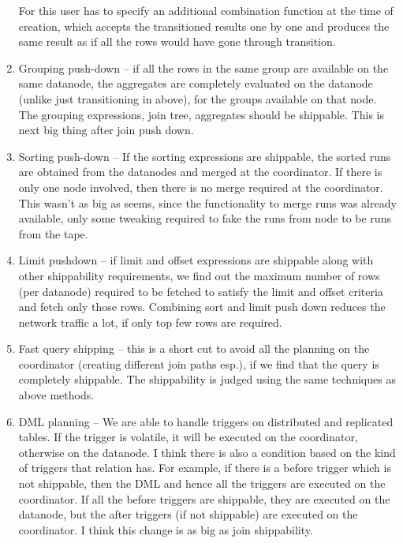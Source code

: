 \begin{enumerate}
			  For this user has to specify an additional combination function at the time of
			  creation, which accepts the transitioned results one by one and produces the
			  same result as if all the rows would have gone through transition.
		\item Grouping push-down -- if all the rows in the same group are available on the
			  same datanode, the aggregates are completely evaluated on the datanode
			  (unlike just transitioning in above), for the groups available on that node.
			  The grouping expressions, join tree, aggregates should be shippable.
			  This is next big thing after join push down.
		\item Sorting push-down -- If the sorting expressions are shippable, the sorted
			  runs are obtained from the datanodes and merged at the coordinator.
			  If there is only one node involved, then there is no merge required at
			  the coordinator.
			  This wasn't as big as seems, since the functionality to merge runs was
			  already available, only some tweaking required to fake the runs from node
			  to be runs from the tape.
		\item Limit pushdown -- if limit and offset expressions are shippable along
			  with other shippability requirements, we find out the maximum number
			  of rows (per datanode) required to be fetched to satisfy the limit
			  and offset criteria and fetch only those rows.
			  Combining sort and limit push down reduces the network traffic a lot,
			  if only top few rows are required.
		\item Fast query shipping -- this is a short cut to avoid all the planning
			  on the coordinator (creating different join paths esp.), if we find
			  that the query is completely shippable.
			  The shippability is judged using the same techniques as above methods.
		\item DML planning -- We are able to handle triggers on distributed and
			  replicated tables.
			  If the trigger is volatile, it will be executed on the coordinator, otherwise
			  on the datanode.
			  I think there is also a condition based on the kind of triggers that
			  relation has.
			  For example, if there is a before trigger which is not shippable, then the DML
			  and hence all the triggers are executed on the coordinator.
			  If all the before triggers are shippable, they are executed on the datanode,
			  but the after triggers (if not shippable) are executed on the coordinator.
			  I think this change is as big as join shippability.
	\end{enumerate}


